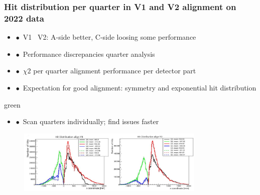\documentclass[xcolor=dvipsnames, aspectratio=1610, 12pt]{beamer}
\begin{document}
\begin{frame}\frametitle{Hit distribution per quarter in V1 and V2 alignment on 2022 data}
  \begin{itemize}
    \item $\bullet$\, V1 \to\, V2: A-side better, C-side loosing some performance
    \item $\bullet$\, Performance discrepancies \to quarter analysis
    \item $\bullet$\, $\chi2$ per quarter \to alignment performance per detector part
    \item $\bullet$\, Expectation for good alignment: symmetry and exponential hit distribution
  \end{itemize}
  \begin{mybox}{green}{}
    \begin{itemize}
      \item $\bullet$\, Scan quarters individually; find issues faster
    \end{itemize}
  \end{mybox}
  \begin{figure}
      \includegraphics[width=0.8\textwidth]{logos/v1_v2.png}%
  \end{figure}
\end{frame}
\end{document}
